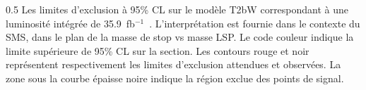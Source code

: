 

                 {0.5}       %
                 { Les limites d'exclusion à 95\% CL sur le modèle T2bW correspondant à une luminosité intégrée de 35.9~fb$^{-1}$~\cite{Sirunyan:2017xse}. L'interprétation est fournie dans le contexte du SMS, dans le plan de la masse de stop vs masse LSP. Le code couleur indique la limite supérieure de 95\% CL sur la section. Les contours rouge et noir représentent respectivement les limites d'exclusion attendues et observées. La zone sous la courbe épaisse noire indique la région exclue des points de signal. }



